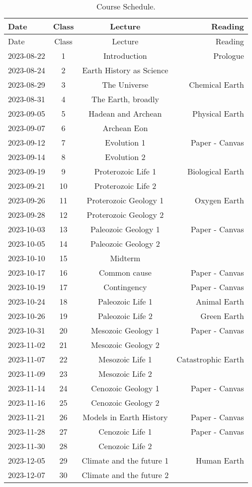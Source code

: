 \documentclass[11pt,]{article}
\begin{document}
\begin{longtable}[]{@{}lccr@{}}
\caption{Course Schedule.}\tabularnewline
\toprule()
Date & Class & Lecture & Reading \\
\midrule()
\endfirsthead
\toprule()
Date & Class & Lecture & Reading \\
\midrule()
\endhead
2023-08-22 & 1 & Introduction & Prologue \\
2023-08-24 & 2 & Earth History as Science & \\
2023-08-29 & 3 & The Universe & Chemical Earth \\
2023-08-31 & 4 & The Earth, broadly & \\
2023-09-05 & 5 & Hadean and Archean & Physical Earth \\
2023-09-07 & 6 & Archean Eon & \\
2023-09-12 & 7 & Evolution 1 & Paper - Canvas \\
2023-09-14 & 8 & Evolution 2 & \\
2023-09-19 & 9 & Proterozoic Life 1 & Biological Earth \\
2023-09-21 & 10 & Proterozoic Life 2 & \\
2023-09-26 & 11 & Proterozoic Geology 1 & Oxygen Earth \\
2023-09-28 & 12 & Proterozoic Geology 2 & \\
2023-10-03 & 13 & Paleozoic Geology 1 & Paper - Canvas \\
2023-10-05 & 14 & Paleozoic Geology 2 & \\
2023-10-10 & 15 & Midterm & \\
2023-10-17 & 16 & Common cause & Paper - Canvas \\
2023-10-19 & 17 & Contingency & Paper - Canvas \\
2023-10-24 & 18 & Paleozoic Life 1 & Animal Earth \\
2023-10-26 & 19 & Paleozoic Life 2 & Green Earth \\
2023-10-31 & 20 & Mesozoic Geology 1 & Paper - Canvas \\
2023-11-02 & 21 & Mesozoic Geology 2 & \\
2023-11-07 & 22 & Mesozoic Life 1 & Catastrophic Earth \\
2023-11-09 & 23 & Mesozoic Life 2 & \\
2023-11-14 & 24 & Cenozoic Geology 1 & Paper - Canvas \\
2023-11-16 & 25 & Cenozoic Geology 2 & \\
2023-11-21 & 26 & Models in Earth History & Paper - Canvas \\
2023-11-28 & 27 & Cenozoic Life 1 & Paper - Canvas \\
2023-11-30 & 28 & Cenozoic Life 2 & \\
2023-12-05 & 29 & Climate and the future 1 & Human Earth \\
2023-12-07 & 30 & Climate and the future 2 & \\
\bottomrule()
\end{longtable}
\end{document}
